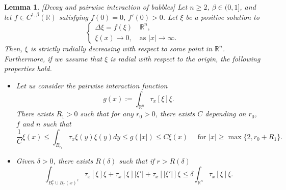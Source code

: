 \documentclass[11pt,letterpaper,reqno]{amsart}
\newcommand{\R}{\mathbb{R}}
\theoremstyle{plain}%
\newtheorem{lemma}[theorem]{Lemma}
\theoremstyle{definition}
\numberwithin{equation}{section}
\numberwithin{figure}{section}
\begin{document}
\begin{lemma}\label{lemma pairwise inter}[Decay and pairwise interaction of bubbles]
Let $n\geq 2$, $\beta\in (0,1]$, and let $f \in C^{1,\beta}(\R)$ satisfying $f(0)=0$, $f'(0)>0$. Let $\xi$ be a positive solution to
\begin{equation}\label{eq gsap}
\begin{cases}
\Delta \xi = f(\xi) \quad  \R^n, \\
 \xi(x) \to 0, \quad  \text{as $|x| \to \infty$}.
\end{cases}
\end{equation} 
Then, $\xi$ is strictly radially decreasing with respect to some point in $\R^n$. Furthermore, if we assume that $\xi$ is radial with respect to the origin, the following properties hold.
\begin{itemize}	
	\item Let us consider the pairwise interaction function 
	$$g(x) := \int_{\R^n} \tau_{x}[\xi]\xi.$$
	There exists $R_1>0$ such that for any $r_0>0$, there exists $C$ depending on $r_0$, $f$ and $n$ such that
	\begin{equation}\label{eq interaction function}
\frac{1}{C}\xi(x)\leq \int_{B_{r_0}} \tau_{x}\xi(y) \xi(y)dy \leq g(|x|) \leq C \xi(x)\quad \mbox{ for $|x|\geq \max\{2,r_0+R_1\}$.}
	\end{equation}

\item 
Given $\delta>0$, there exists $R(\delta)$ such that if $r>R(\delta)$ 
\begin{equation}\label{eq small inter}
	\int_{ B_r^c \cup B_r(x)^c} \tau_{x}[\xi] \xi +\tau_{x}[\xi] |\xi'| + \tau_{x}[|\xi'|] \xi \leq \delta	\int_{\R^n} \tau_{x}[\xi] \xi .
\end{equation}

\end{itemize}
\end{lemma}
\end{document}
